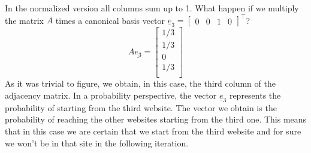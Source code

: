 In the normalized version all columns sum up to 1. What happen if we multiply the matrix $A$ times a canonical basis vector $\underline{e}_3 = \begin{bmatrix}
    0 & 0 & 1 & 0
\end{bmatrix}^\intercal$?
\[
    A\underline{e_3} = \begin{bmatrix}
        1/3\\
        1/3\\
        0\\
        1/3\\
    \end{bmatrix}
\]
As it was trivial to figure, we obtain, in this case, the third column of the adjacency matrix. In a probability perspective, the vector $\underline{e}_3$ represents the probability of starting from the third website. The vector we obtain is the probability of reaching the other websites starting from the third one. This means that in this case we are certain that we start from the third website and for sure we won't be in that site in the following iteration. \\

